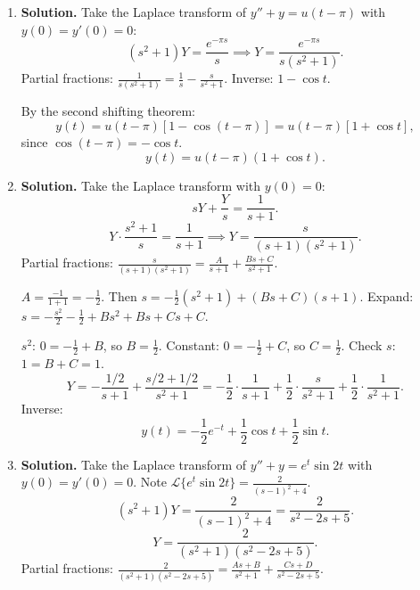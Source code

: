 \begin{enumerate}
Second term: $\frac{1}{(s+1)^3(s+2)}$. Let $w=s+1$:
\[
\frac{1}{w^3(w+1)}=\frac{A}{w}+\frac{B}{w^2}+\frac{C}{w^3}+\frac{D}{w+1}.
\]
$C=\frac{1}{1}=1$. $D=\frac{1}{(-1)^3}=-1$. Expand: $1=Aw^2(w+1)+Bw(w+1)+C(w+1)+Dw^3$. Setting $w=0$: $1=C$. Setting $w=-1$: $1=-D$, so $D=-1$.

Expand fully: $Aw^3+Aw^2+Bw^2+Bw+Cw+C+Dw^3=(A+D)w^3+(A+B)w^2+(B+C)w+C$.

$C=1$. Coefficient of $w^3$: $A+D=0$, so $A=1$. Coefficient of $w^2$: $A+B=0$, so $B=-1$. Check $w$: $B+C=-1+1=0$. 
So $\frac{1}{(s+1)^3(s+2)}=\frac{1}{s+1}-\frac{1}{(s+1)^2}+\frac{1}{(s+1)^3}-\frac{1}{s+2}$.

Inverse: $e^{-t}-te^{-t}+\frac{t^2}{2}e^{-t}-e^{-2t}$.

Combining both terms:
\[
y = 2e^{-t}-e^{-2t}+e^{-t}-te^{-t}+\frac{t^2}{2}e^{-t}-e^{-2t} = 3e^{-t}-te^{-t}+\frac{t^2}{2}e^{-t}-2e^{-2t}.
\]
\[
\boxed{y(t) = \left(3-t+\frac{t^2}{2}\right)e^{-t}-2e^{-2t}}.
\]

\item \textbf{Solution.}
Take the Laplace transform of $y''+y=u(t-\pi)$ with $y(0)=y'(0)=0$:
\[
(s^2+1)Y = \frac{e^{-\pi s}}{s} \implies Y = \frac{e^{-\pi s}}{s(s^2+1)}.
\]
Partial fractions: $\frac{1}{s(s^2+1)}=\frac{1}{s}-\frac{s}{s^2+1}$. Inverse: $1-\cos t$.

By the second shifting theorem:
\[
y(t) = u(t-\pi)[1-\cos(t-\pi)] = u(t-\pi)[1+\cos t],
\]
since $\cos(t-\pi)=-\cos t$.
\[
\boxed{y(t) = u(t-\pi)(1+\cos t)}.
\]

\item \textbf{Solution.}
Take the Laplace transform with $y(0)=0$:
\[
sY + \frac{Y}{s} = \frac{1}{s+1}.
\]
\[
Y\cdot\frac{s^2+1}{s}=\frac{1}{s+1} \implies Y = \frac{s}{(s+1)(s^2+1)}.
\]
Partial fractions: $\frac{s}{(s+1)(s^2+1)}=\frac{A}{s+1}+\frac{Bs+C}{s^2+1}$.

$A=\frac{-1}{1+1}=-\frac{1}{2}$. Then $s=-\frac{1}{2}(s^2+1)+(Bs+C)(s+1)$. Expand: $s=-\frac{s^2}{2}-\frac{1}{2}+Bs^2+Bs+Cs+C$.

$s^2$: $0=-\frac{1}{2}+B$, so $B=\frac{1}{2}$. Constant: $0=-\frac{1}{2}+C$, so $C=\frac{1}{2}$. Check $s$: $1=B+C=1$. 
\[
Y = -\frac{1/2}{s+1}+\frac{s/2+1/2}{s^2+1}=-\frac{1}{2}\cdot\frac{1}{s+1}+\frac{1}{2}\cdot\frac{s}{s^2+1}+\frac{1}{2}\cdot\frac{1}{s^2+1}.
\]
Inverse:
\[
\boxed{y(t) = -\frac{1}{2}e^{-t}+\frac{1}{2}\cos t+\frac{1}{2}\sin t}.
\]

\item \textbf{Solution.}
Take the Laplace transform of $y''+y=e^t\sin 2t$ with $y(0)=y'(0)=0$. Note $\mathcal{L}\{e^t\sin 2t\}=\frac{2}{(s-1)^2+4}$.
\[
(s^2+1)Y = \frac{2}{(s-1)^2+4}=\frac{2}{s^2-2s+5}.
\]
\[
Y = \frac{2}{(s^2+1)(s^2-2s+5)}.
\]
Partial fractions: $\frac{2}{(s^2+1)(s^2-2s+5)}=\frac{As+B}{s^2+1}+\frac{Cs+D}{s^2-2s+5}$.


\end{enumerate}
